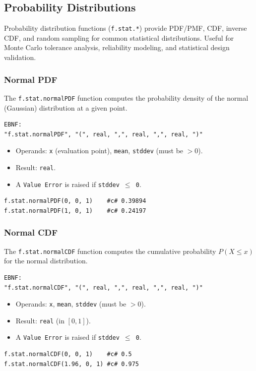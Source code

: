 \subsection{Probability Distributions}

Probability distribution functions (\texttt{f.stat.*}) provide PDF/PMF, CDF, inverse CDF, and random sampling for common statistical distributions. Useful for Monte Carlo tolerance analysis, reliability modeling, and statistical design validation.

\subsubsection{Normal PDF}
The \texttt{f.stat.normalPDF} function computes the probability density of the normal (Gaussian) distribution at a given point.
\begin{verbatim}
EBNF:
"f.stat.normalPDF", "(", real, ",", real, ",", real, ")"
\end{verbatim}
\begin{itemize}
\item Operands: \texttt{x} (evaluation point), \texttt{mean}, \texttt{stddev} (must be $> 0$).
\item Result: \texttt{real}.
\item A \texttt{Value Error} is raised if \texttt{stddev $\leq$ 0}.
\end{itemize}
\begin{verbatim}
f.stat.normalPDF(0, 0, 1)    #c# 0.39894
f.stat.normalPDF(1, 0, 1)    #c# 0.24197
\end{verbatim}

\subsubsection{Normal CDF}
The \texttt{f.stat.normalCDF} function computes the cumulative probability $P(X \leq x)$ for the normal distribution.
\begin{verbatim}
EBNF:
"f.stat.normalCDF", "(", real, ",", real, ",", real, ")"
\end{verbatim}
\begin{itemize}
\item Operands: \texttt{x}, \texttt{mean}, \texttt{stddev} (must be $> 0$).
\item Result: \texttt{real} (in $[0, 1]$).
\item A \texttt{Value Error} is raised if \texttt{stddev $\leq$ 0}.
\end{itemize}
\begin{verbatim}
f.stat.normalCDF(0, 0, 1)    #c# 0.5
f.stat.normalCDF(1.96, 0, 1) #c# 0.975
\end{verbatim}

